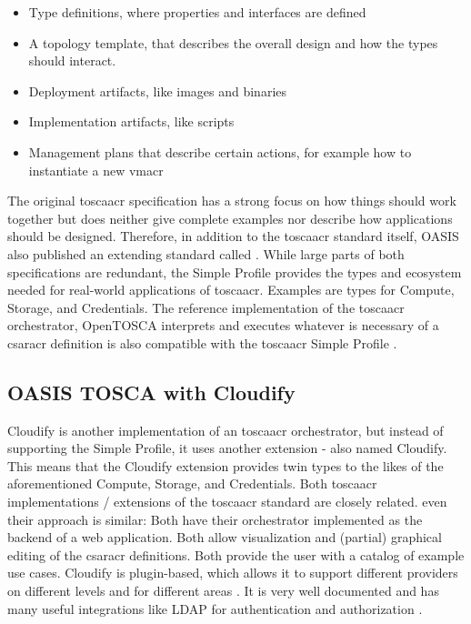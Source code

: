 \begin{itemize}
  \item Type definitions, where properties and interfaces are defined
  \item A topology template, that describes the overall design and how the types should interact.
  \item Deployment artifacts, like images and binaries
  \item Implementation artifacts, like scripts
  \item Management plans that describe certain actions, for example how to instantiate a new \gls{vmacr}
\end{itemize}
The original \gls{toscaacr} specification has a strong focus on how things should work together but does neither give complete examples nor describe how applications should be designed. Therefore, in addition to the \gls{toscaacr} standard itself, OASIS also published an extending standard called  \cite{tosca_simple_profile_v1_3}. While large parts of both specifications are redundant, the Simple Profile provides the types and ecosystem needed for real-world applications of \gls{toscaacr}. Examples are types for Compute, Storage, and Credentials. The reference implementation of the \gls{toscaacr} orchestrator, OpenTOSCA interprets and executes whatever is necessary of a \gls{csaracr} definition is also compatible with the \gls{toscaacr} Simple Profile \cite{opentosca_how_to_csar}.

\subsection{OASIS TOSCA with Cloudify}
Cloudify is another implementation of an \gls{toscaacr} orchestrator, but instead of supporting the Simple Profile, it uses another extension - also named Cloudify. This means that the Cloudify extension provides twin types to the likes of the aforementioned Compute, Storage, and Credentials.
Both \gls{toscaacr} implementations / extensions of the \gls{toscaacr} standard are closely related. even their approach is similar: Both have their orchestrator implemented as the backend of a web application. Both allow visualization and (partial) graphical editing of the \gls{csaracr} definitions. Both provide the user with a catalog of example use cases.
\newline
Cloudify is plugin-based, which allows it to support different providers on different levels and for different areas \cite{cloudify_plugins}. It is very well documented and has many useful integrations like LDAP for authentication and authorization \cite{cloudify_ldap_integration}.

